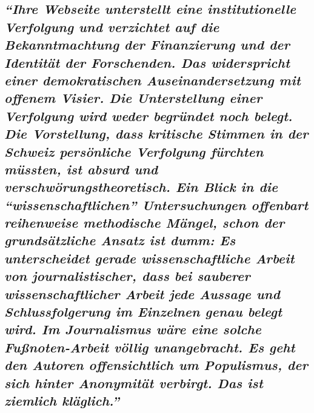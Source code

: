 {\subsection{\texorpdfstring{\emph{``Ihre Webseite unterstellt eine
institutionelle Verfolgung und verzichtet auf die Bekanntmachtung der
Finanzierung und der Identität der Forschenden. Das widerspricht einer
demokratischen Auseinandersetzung mit offenem Visier. Die Unterstellung
einer Verfolgung wird weder begründet noch belegt. Die Vorstellung, dass
kritische Stimmen in der Schweiz persönliche Verfolgung fürchten
müssten, ist absurd und verschwörungstheoretisch. Ein Blick in die
``wissenschaftlichen'' Untersuchungen offenbart reihen­weise methodische
Mängel, schon der grundsätzliche Ansatz ist dumm: Es unterscheidet
gerade wissen­schaftliche Arbeit von journalistischer, dass bei sauberer
wissenschaftlicher Arbeit jede Aussage und Schluss­folgerung im
Einzelnen genau belegt wird. Im Journalismus wäre eine solche
Fußnoten-Arbeit völlig unangebracht. Es geht den Autoren offensichtlich
um Populismus, der sich hinter Anonymität verbirgt. Das ist ziemlich
kläglich.''}}{``Ihre Webseite unterstellt eine institutionelle Verfolgung und verzichtet auf die Bekanntmachtung der Finanzierung und der Identität der Forschenden. Das widerspricht einer demokratischen Auseinandersetzung mit offenem Visier. Die Unterstellung einer Verfolgung wird weder begründet noch belegt. Die Vorstellung, dass kritische Stimmen in der Schweiz persönliche Verfolgung fürchten müssten, ist absurd und verschwörungstheoretisch. Ein Blick in die ``wissenschaftlichen'' Untersuchungen offenbart reihen­weise methodische Mängel, schon der grundsätzliche Ansatz ist dumm: Es unterscheidet gerade wissen­schaftliche Arbeit von journalistischer, dass bei sauberer wissenschaftlicher Arbeit jede Aussage und Schluss­folgerung im Einzelnen genau belegt wird. Im Journalismus wäre eine solche Fußnoten-Arbeit völlig unangebracht. Es geht den Autoren offensichtlich um Populismus, der sich hinter Anonymität verbirgt. Das ist ziemlich kläglich.''}}\label{ihre-webseite-unterstellt-eine-institutionelle-verfolgung-und-verzichtet-auf-die-bekanntmachtung-der-finanzierung-und-der-identituxe4t-der-forschenden-das-widerspricht-einer-demokratischen-auseinandersetzung-mit-offenem-visier-die-unterstellung-einer-verfolgung-wird-weder-begruxfcndet-noch-belegt-die-vorstellung-dass-kritische-stimmen-in-der-schweiz-persuxf6nliche-verfolgung-fuxfcrchten-muxfcssten-ist-absurd-und-verschwuxf6rungstheoretisch-ein-blick-in-die-wissenschaftlichen-untersuchungen-offenbart-reihenweise-methodische-muxe4ngel-schon-der-grundsuxe4tzliche-ansatz-ist-dumm-es-unterscheidet-gerade-wissenschaftliche-arbeit-von-journalistischer-dass-bei-sauberer-wissenschaftlicher-arbeit-jede-aussage-und-schlussfolgerung-im-einzelnen-genau-belegt-wird-im-journalismus-wuxe4re-eine-solche-fuuxdfnoten-arbeit-vuxf6llig-unangebracht-es-geht-den-autoren-offensichtlich-um-populismus-der-sich-hinter-anonymituxe4t-verbirgt-das-ist-ziemlich-kluxe4glich}}


